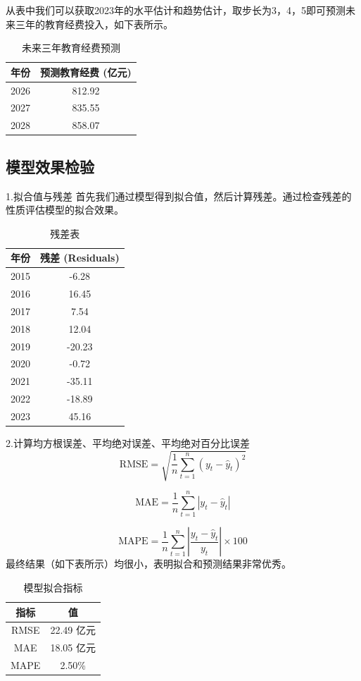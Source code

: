 \documentclass[UTF8, zihao=-4]{ctexart}
\begin{document}
从表中我们可以获取2023年的水平估计和趋势估计，取步长为3，4，5即可预测未来三年的教育经费投入，如下表所示。
\begin{table}[h]
    \centering
    \begin{tabular}{|c|c|}
    \hline
    \textbf{年份} & \textbf{预测教育经费 (亿元)} \\ \hline
    2026 & 812.92 \\ \hline
    2027 & 835.55 \\ \hline
    2028 & 858.07 \\ \hline
    \end{tabular}
    \caption{未来三年教育经费预测}
    \end{table}
    
\subsection{模型效果检验}
1.拟合值与残差
首先我们通过模型得到拟合值，然后计算残差。通过检查残差的性质评估模型的拟合效果。
\begin{table}[ht]
    \centering
    \begin{tabular}{|c|c|}
    \hline
    \textbf{年份} & \textbf{残差 (Residuals)} \\ \hline
    2015 & -6.28 \\ \hline
    2016 & 16.45 \\ \hline
    2017 & 7.54 \\ \hline
    2018 & 12.04 \\ \hline
    2019 & -20.23 \\ \hline
    2020 & -0.72 \\ \hline
    2021 & -35.11 \\ \hline
    2022 & -18.89 \\ \hline
    2023 & 45.16 \\ \hline
    \end{tabular}
    \caption{残差表}
    \end{table}

2.计算均方根误差、平均绝对误差、平均绝对百分比误差
\[
\text{RMSE} = \sqrt{\frac{1}{n} \sum_{t=1}^{n} (y_t - \hat{y}_t)^2}
\]

\[
\text{MAE} = \frac{1}{n} \sum_{t=1}^{n} |y_t - \hat{y}_t|
\]

\[
\text{MAPE} = \frac{1}{n} \sum_{t=1}^{n} \left|\frac{y_t - \hat{y}_t}{y_t}\right| \times 100
\]
最终结果（如下表所示）均很小，表明拟合和预测结果非常优秀。
\begin{table}[h]
    \centering
    \begin{tabular}{|c|c|}
    \hline
    \textbf{指标} & \textbf{值} \\ \hline
    RMSE & 22.49 亿元 \\ \hline
    MAE  & 18.05 亿元 \\ \hline
    MAPE & 2.50\% \\ \hline
    \end{tabular}
    \caption{模型拟合指标}
\end{table}
\end{document}
